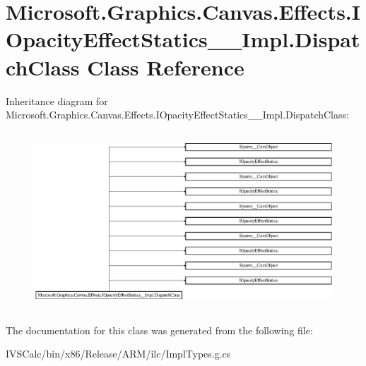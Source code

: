 \hypertarget{class_microsoft_1_1_graphics_1_1_canvas_1_1_effects_1_1_i_opacity_effect_statics_____impl_1_1_dispatch_class}{}\section{Microsoft.\+Graphics.\+Canvas.\+Effects.\+I\+Opacity\+Effect\+Statics\+\_\+\+\_\+\+Impl.\+Dispatch\+Class Class Reference}
\label{class_microsoft_1_1_graphics_1_1_canvas_1_1_effects_1_1_i_opacity_effect_statics_____impl_1_1_dispatch_class}
Inheritance diagram for Microsoft.\+Graphics.\+Canvas.\+Effects.\+I\+Opacity\+Effect\+Statics\+\_\+\+\_\+\+Impl.\+Dispatch\+Class\+:\begin{figure}[H]
\begin{center}
\leavevmode
\includegraphics[height=6.710239cm]{class_microsoft_1_1_graphics_1_1_canvas_1_1_effects_1_1_i_opacity_effect_statics_____impl_1_1_dispatch_class}
\end{center}
\end{figure}


The documentation for this class was generated from the following file\+:\begin{DoxyCompactItemize}
\item 
I\+V\+S\+Calc/bin/x86/\+Release/\+A\+R\+M/ilc/Impl\+Types.\+g.\+cs\end{DoxyCompactItemize}

